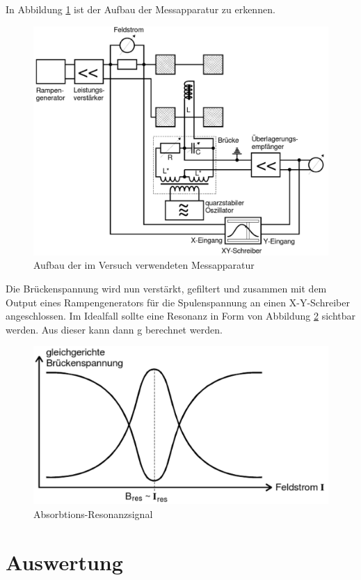 In Abbildung \ref{pic_aufbau} ist der Aufbau der Messapparatur zu erkennen.
\begin{figure}[H]
\includegraphics[scale=0.4]{../pics/aufbau.pdf}
\caption{Aufbau der im Versuch verwendeten Messapparatur}
\label{pic_aufbau}
\end{figure}

Die Brückenspannung wird nun verstärkt, gefiltert und zusammen mit dem Output eines Rampengenerators für die Spulenspannung an einen X-Y-Schreiber angeschlossen. Im Idealfall sollte eine Resonanz in Form von Abbildung \ref{pic_resonanz} sichtbar werden. Aus dieser kann dann g berechnet werden.
\begin{figure}
\includegraphics[scale=0.5]{../pics/resonanz.pdf}
\caption{Absorbtions-Resonanzsignal}
\label{pic_resonanz}
\end{figure}


\section{Auswertung}
